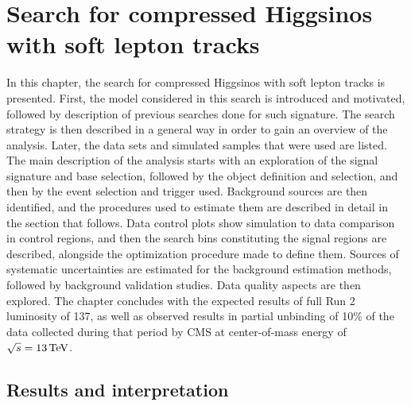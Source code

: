 \chapter{Search for compressed Higgsinos with soft lepton tracks}

In this chapter, the search for compressed Higgsinos with soft lepton tracks is presented.
First, the model considered in this search is introduced and motivated, followed by description of previous searches done for such signature. The search strategy is then described in a general way in order to gain an overview of the analysis. Later, the data sets and simulated samples that were used are listed. The main description of the analysis starts with an exploration of the signal signature and base selection, followed by the object definition and selection, and then by the event selection and trigger used. Background sources are then identified, and the procedures used to estimate them are described in detail in the section that follows. Data control plots show simulation to data comparison in control regions, and then the search bins constituting the signal regions are described, alongside the optimization procedure made to define them. Sources of systematic uncertainties are estimated
for the background estimation methods, followed by background validation studies. Data quality aspects are then explored. The chapter concludes with the expected results of full Run 2 luminosity of 137\fbinv, as well as observed results in partial unbinding of 10\% of the data collected during that period by CMS at center-of-mass energy of $\sqrt{s}=13\,\text{Te\hspace{-.08em}V}$.


























\clearpage
\section{Results and interpretation}


